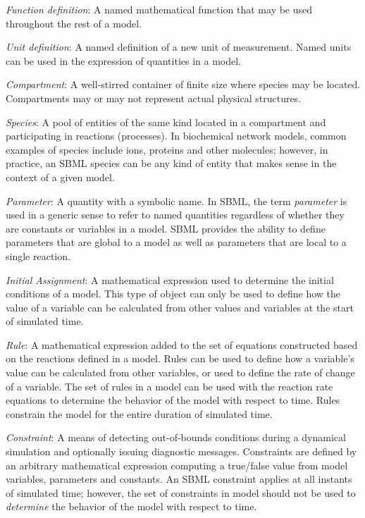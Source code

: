 \begin{description}
  
\item \emph{Function definition}: A named mathematical function
  that may be used throughout the rest of a model.

\item \emph{Unit definition}: A named definition of a new unit of
  measurement.  Named units can be used in the expression of
  quantities in a model.

\item \emph{Compartment}: A well-stirred container of finite size
  where species may be located.  Compartments may or may not
  represent actual physical structures.

\item \emph{Species}: A pool of entities of the same kind located
  in a compartment and participating in reactions (processes).  In
  biochemical network models, common examples of species include
  ions, proteins and other molecules; however, in practice, an
  SBML species can be any kind of entity that makes sense in the
  context of a given model.

\item \emph{Parameter}: A quantity with a symbolic name.  In SBML,
  the term \emph{parameter} is used in a generic sense to refer to
  named quantities regardless of whether they are constants or
  variables in a model.  SBML \thisL provides the ability to
  define parameters that are global to a model as well as
  parameters that are local to a single reaction.
  
\item \emph{Initial Assignment}: A mathematical
  expression used to determine the initial conditions of a
  model.  This type of object can only be used to define how
  the value of a variable can be calculated from other values
  and variables at the start of simulated time.
  
\item \emph{Rule}: A mathematical expression added to the set of
  equations constructed based on the reactions defined in a model.
  Rules can be used to define how a variable's value can be
  calculated from other variables, or used to define the rate of
  change of a variable.  The set of rules in a model can be used
  with the reaction rate equations to determine the behavior of
  the model with respect to time.  Rules constrain the model for
  the entire duration of simulated time.

\item \emph{Constraint}: A means of detecting out-of-bounds
  conditions during a dynamical simulation and optionally issuing
  diagnostic messages.  Constraints are defined by an arbitrary
  mathematical expression computing a true/false value from model
  variables, parameters and constants.  An SBML constraint applies
  at all instants of simulated time; however, the set of
  constraints in model should not be used to \emph{determine} the
  behavior of the model with respect to time.
  

\end{description}
